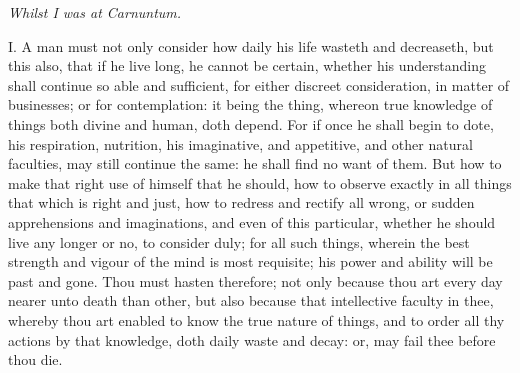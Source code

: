 \emph{Whilst I was at Carnuntum.}


I. A man must not only consider how daily his life wasteth and
decreaseth, but this also, that if he live long, he cannot be certain,
whether his understanding shall continue so able and sufficient, for
either discreet consideration, in matter of businesses; or for
contemplation: it being the thing, whereon true knowledge of things both
divine and human, doth depend. For if once he shall begin to dote, his
respiration, nutrition, his imaginative, and appetitive, and other natural
faculties, may still continue the same: he shall find no want of them. But
how to make that right use of himself that he should, how to observe
exactly in all things that which is right and just, how to redress and
rectify all wrong, or sudden apprehensions and imaginations, and even of
this particular, whether he should live any longer or no, to consider
duly; for all such things, wherein the best strength and vigour of the
mind is most requisite; his power and ability will be past and gone. Thou
must hasten therefore; not only because thou art every day nearer unto
death than other, but also because that intellective faculty in thee,
whereby thou art enabled to know the true nature of things, and to order
all thy actions by that knowledge, doth daily waste and decay: or, may
fail thee before thou die.

